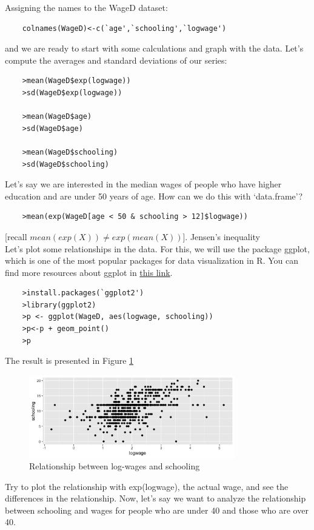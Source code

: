 \documentclass[11pt,letterpaper]{article}
\begin{document}
Assigning the names to the WageD dataset:
\begin{verbatim}
    colnames(WageD)<-c(`age',`schooling',`logwage')
\end{verbatim}

and we are ready to start with some calculations and graph with the data. Let's compute the averages and standard deviations of our series:
\begin{verbatim}
    >mean(WageD$exp(logwage))
    >sd(WageD$exp(logwage))
    
    >mean(WageD$age)
    >sd(WageD$age)
    
    >mean(WageD$schooling)
    >sd(WageD$schooling)
\end{verbatim}

Let's say we are interested in the median wages of people who have higher education and are under 50 years of age. How can we do this with `data.frame'?

\begin{verbatim}
    >mean(exp(WageD[age < 50 & schooling > 12]$logwage))
\end{verbatim}

[{\color{red}recall $mean(exp(X))\neq exp(mean(X))$]. Jensen's inequality }
\\
Let's plot some relationships in the data. For this, we will use the package ggplot, which is one of the most popular packages for data visualization in R. You can find more resources about ggplot in \href{https://ggplot2.tidyverse.org/}{this link}.

\begin{verbatim}
    >install.packages(`ggplot2')
    >library(ggplot2)
    >p <- ggplot(WageD, aes(logwage, schooling))
    >p<-p + geom_point()
    >p
\end{verbatim}

The result is presented in Figure \ref{fig:logwagedu}
\begin{figure}[H]
\begin{center}
\caption{Relationship between log-wages and schooling}
\label{fig:logwagedu}
\includegraphics[width=0.8\textwidth]{LogWageSchooling.png}
\end{center}
\end{figure}
Try to plot the relationship with exp(logwage), the actual wage, and see the differences in the relationship. Now, let's say we want to analyze the relationship between schooling and wages for people who are under 40 and those who are over 40.
\end{document}
